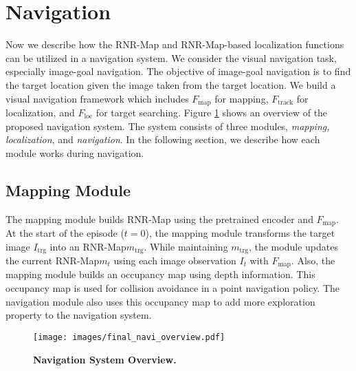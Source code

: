 \documentclass[10pt,twocolumn,letterpaper]{article}
\def\proposed{RNR-Map\xspace}
\begin{document}
\section{Navigation}
\vspace{-0.2cm}
Now we describe how the \proposed and \proposed-based localization functions can be utilized in a navigation system.
%
We consider the visual navigation task, especially image-goal navigation.
%
The objective of image-goal navigation is to find the target location given the image taken from the target location.
%
We build a visual navigation framework which includes $F_\mathrm{map}$ for mapping, $F_\mathrm{track}$ for localization, and $F_\mathrm{loc}$ for target searching.
%
Figure \ref{fig:navi_overview} shows an overview of the proposed navigation system. 
%
The system consists of three modules, \textit{mapping, localization}, and \textit{navigation}.
%
In the following section, we describe how each module works during navigation.  

\subsection{Mapping Module}
The mapping module builds \proposed using the pretrained encoder and $F_\mathrm{map}$. 
%
At the start of the episode ($t=0$), the mapping module transforms the target image $I_\mathrm{trg}$ into an \proposed  $m_\mathrm{trg}$. 
%
While maintaining $m_\mathrm{trg}$, the module updates the current \proposed  $m_t$ using each image observation $I_t$ with $F_\mathrm{map}$.
%
Also, the mapping module builds an occupancy map using depth information.
%
This occupancy map is used for collision avoidance in a point navigation policy.
The navigation module also uses this occupancy map to add more exploration property to the navigation system.


\begin{figure}
  \centering
  \texttt{[image: images/final\_navi\_overview.pdf]}
    \vspace{-0.6cm}
  \caption{\textbf{Navigation System Overview.}}
  \vspace{-0.3cm}
\label{fig:navi_overview}
\end{figure}
\end{document}
